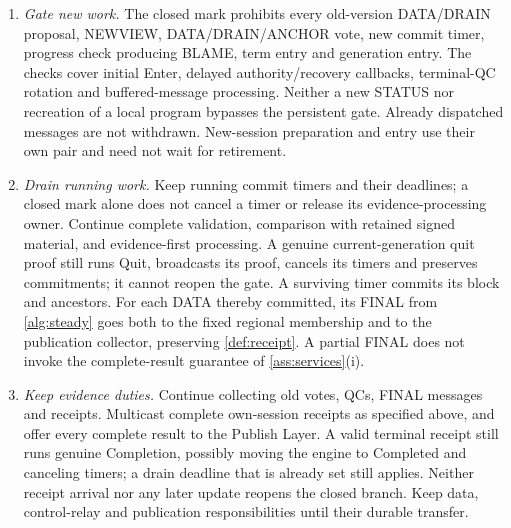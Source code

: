 \documentclass[11pt,a4paper]{article}
\begin{document}
\begin{enumerate}[label=(\roman*),itemsep=2pt]
but $c_v$ is not assigned and no $4\Delta$ clock is invented.
Whenever any old-pair ReadyBundle, proposal, authority, history or other packet
provides the missing authenticated snapshot context, the Session Manager
completes and multicasts the close bundle in that receive
handler, and replies with it to the packet's sender. Do this before
ordinary BFT processing, rejecting a live-entry request, discarding a
duplicate, or returning a Terminated/tombstone result. Historical
context is validated without requiring that the old version remain
open. Complete proposals from correct voters carry or resolve this
context within the complete-message bound. This handler is
mandatory even if the old program was never created, its ReadyBundle
is refused, or a delayed callback arrives after exit or restart.
\item \emph{Gate new work.} The closed mark prohibits every old-version
DATA/DRAIN proposal, NEWVIEW, DATA/DRAIN/ANCHOR vote, new commit timer,
progress check producing BLAME, term entry and generation entry.
The checks cover initial Enter, delayed authority/recovery callbacks,
terminal-QC rotation and buffered-message processing. Neither a new
STATUS nor recreation of a local program bypasses the persistent gate.
Already dispatched messages are not withdrawn. New-session preparation
and entry use their own pair and need not wait for retirement.
\item \emph{Drain running work.} Keep running commit timers and
their deadlines; a closed mark alone does not cancel a
timer or release its evidence-processing owner. Continue complete
validation, comparison with retained signed material, and evidence-first
processing. A genuine current-generation quit proof still runs Quit,
broadcasts its proof, cancels its timers and preserves commitments;
it cannot reopen the gate. A surviving timer commits its block and
ancestors. For each DATA thereby committed, its FINAL from \cref{alg:steady} goes
both to the fixed regional membership and to the publication collector,
preserving \cref{def:receipt}. A partial FINAL does not invoke the
complete-result guarantee of \cref{ass:services}(i).
\item \emph{Keep evidence duties.} Continue collecting old votes, QCs,
FINAL messages and receipts. Multicast complete own-session receipts
as specified above, and offer every complete result to the Publish
Layer. A valid terminal receipt still runs genuine Completion,
possibly moving the engine to Completed and canceling timers; a
drain deadline that is already set still applies. Neither receipt arrival nor
any later update reopens the closed branch. Keep data, control-relay and publication
responsibilities until their durable transfer.
\end{enumerate}
\end{document}
